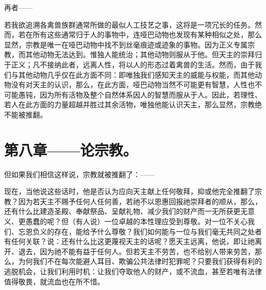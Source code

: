 再者——\par

\par

若我欲追溯各禽兽族群通常所做的最似人工技艺之事，这将是一项冗长的任务。然而，若在所有这些通常归于人的事物中，连哑巴动物也发现有某种相似之处，那么显然，宗教是唯一在哑巴动物中找不到丝毫痕迹或迹象的事物。因为正义专属宗教，而其他动物无法达到。惟独人能统治；其他动物则服从于他。但天主的崇拜归于正义；凡不接纳此者，远离人性，将以人的形态过着禽兽的生活。然而，由于我们与其他动物几乎仅在此方面不同：即唯独我们感知天主的威能与权能，而其他动物没有对天主的认识，那么，在此方面，哑巴动物当然不可能更有智慧，人性也不可能愚钝，因为所有活物及整个自然体系因人的智慧而服从于人。因此，若理性、若人在此方面的力量超越并胜过其余活物，唯独他能认识天主，那么显然，宗教绝不能被推翻。\par


\section{第八章——论宗教。}

但如果我们相信这样说，宗教就被推翻了：——\par

\par

现在，当他说这些话时，他是否认为应向天主献上任何敬拜，抑或他完全推翻了宗教？因为若天主不赐予任何人任何善，若祂不以恩惠回报祂崇拜者的顺从，那么，还有什么比建造圣殿、奉献祭品、呈献礼物、减少我们的财产而一无所获更无意义、更愚蠢的呢？但（有人说）一位卓越的本性理应受到尊敬。对一位不关心我们、忘恩负义的存在，能给予什么尊敬？我们如何能与一位与我们毫无共同之处者有任何关联？说：还有什么比这更蔑视天主的话呢？愿天主远离，他说，即让祂离开、退去，因为祂不能有益于任何人。但若天主不劳苦，也不给别人带来劳苦，那么，为何我们不在每次能避人耳目、欺骗公共法律时犯罪呢？只要我们获得有利的逃脱机会，让我们利用时机：让我们夺取他人的财产，或不流血，甚至若唯有法律值得敬畏，就流血也在所不惜。\par

